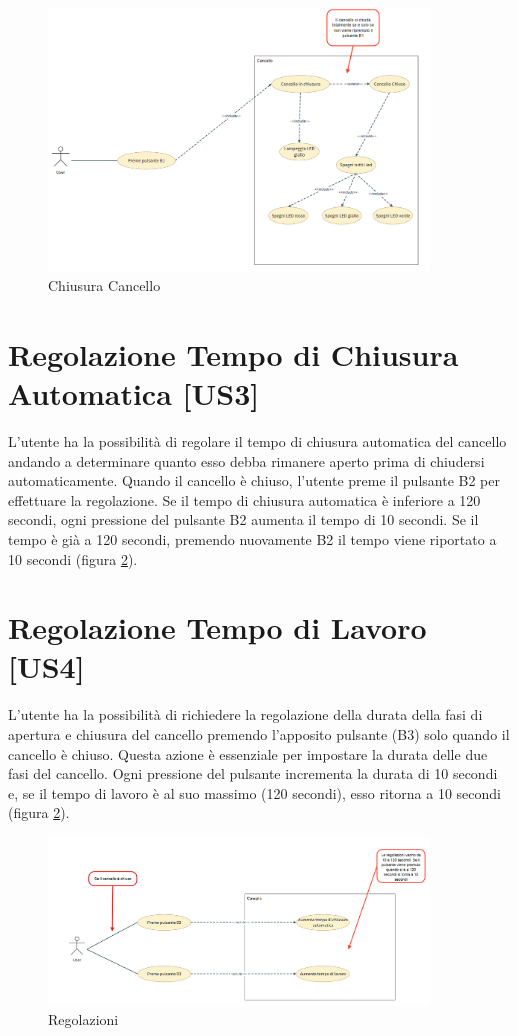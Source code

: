 \begin{figure}[H]
    \centering
    \includegraphics[width=0.9\textwidth]{figures/usecase_2.png}
    \caption{Chiusura Cancello}
    \label{usecase2}
\end{figure}


\section{Regolazione Tempo di Chiusura Automatica [US3]}
L'utente ha la possibilità di regolare il tempo di chiusura automatica del cancello andando a determinare quanto esso debba rimanere aperto prima di chiudersi automaticamente.
Quando il cancello è chiuso, l'utente preme il pulsante B2 per effettuare la regolazione. Se il tempo di chiusura automatica è inferiore a 120 secondi, ogni pressione del pulsante B2 aumenta il tempo di 10 secondi. Se il tempo è già a 120 secondi, premendo nuovamente B2 il tempo viene riportato a 10 secondi (figura \ref{usecase3}).


\section{Regolazione Tempo di Lavoro [US4]}
L'utente ha la possibilità  di richiedere la regolazione della durata della fasi di apertura e chiusura del cancello premendo l'apposito pulsante (B3) solo quando il cancello è chiuso. Questa azione è essenziale per impostare la durata delle due fasi del cancello. Ogni pressione del pulsante incrementa la durata di 10 secondi e, se il tempo di lavoro è al suo massimo (120 secondi), esso ritorna a 10 secondi (figura \ref{usecase3}).

\begin{figure}[H]
    \centering
    \includegraphics[width=0.9\textwidth]{figures/usecase_3.png}
    \caption{Regolazioni}
    \label{usecase3}
\end{figure}


